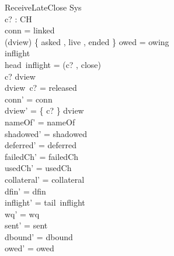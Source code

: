 \documentclass[a4paper,10pt,fleqn]{article}
\begin{document}
\begin{schema}{ReceiveLateClose}
  \Delta Sys \\
  c? : CH \\
\where
  conn = linked \\
  (\ran dview) \cap \{ asked , live , ended \} \neq \emptyset \lor owed = owing \\
  inflight \neq \langle \rangle \\
  head~inflight = (c? , close) \\
  c? \in \dom dview \\
  dview~c? = released \\
  conn' = conn \\
  dview' = \{ c? \} \ndres dview \\
  nameOf' = nameOf \\
  shadowed' = shadowed \\
  deferred' = deferred \\
  failedCh' = failedCh \\
  usedCh' = usedCh \\
  collateral' = collateral \\
  dfin' = dfin \\
  inflight' = tail~inflight \\
  wq' = wq \\
  sent' = sent \\
  dbound' = dbound \\
  owed' = owed
\end{schema}
\end{document}
